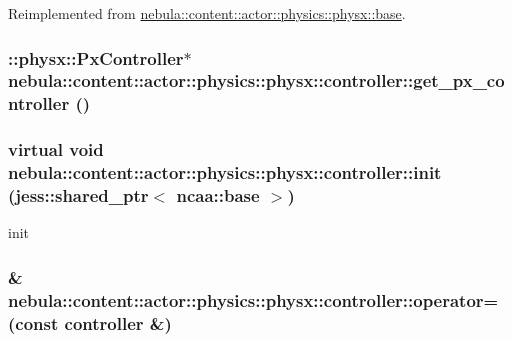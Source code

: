 Reimplemented from \hyperlink{classnebula_1_1content_1_1actor_1_1physics_1_1physx_1_1base_a1468fd6d256631892912ecec7f236c01}{nebula::content::actor::physics::physx::base}.\hypertarget{classnebula_1_1content_1_1actor_1_1physics_1_1physx_1_1controller_a67d2f490804b7182a7c377701d376529}{
\subsubsection[{get\_\-px\_\-controller}]{\setlength{\rightskip}{0pt plus 5cm}::physx::PxController$\ast$ nebula::content::actor::physics::physx::controller::get\_\-px\_\-controller ()}}
\label{classnebula_1_1content_1_1actor_1_1physics_1_1physx_1_1controller_a67d2f490804b7182a7c377701d376529}
\hypertarget{classnebula_1_1content_1_1actor_1_1physics_1_1physx_1_1controller_a59f73afb8e716a0b56818e81c577fe26}{
\subsubsection[{init}]{\setlength{\rightskip}{0pt plus 5cm}virtual void nebula::content::actor::physics::physx::controller::init (jess::shared\_\-ptr$<$ {\bf ncaa::base} $>$)}}
\label{classnebula_1_1content_1_1actor_1_1physics_1_1physx_1_1controller_a59f73afb8e716a0b56818e81c577fe26}


init \hypertarget{classnebula_1_1content_1_1actor_1_1physics_1_1physx_1_1controller_aaa5ea730edb5f50fc8786400375cae52}{
\subsubsection[{operator=}]{\& nebula::content::actor::physics::physx::controller::operator= (const {\bf controller} \&)}}
\label{classnebula_1_1content_1_1actor_1_1physics_1_1physx_1_1controller_aaa5ea730edb5f50fc8786400375cae52}


